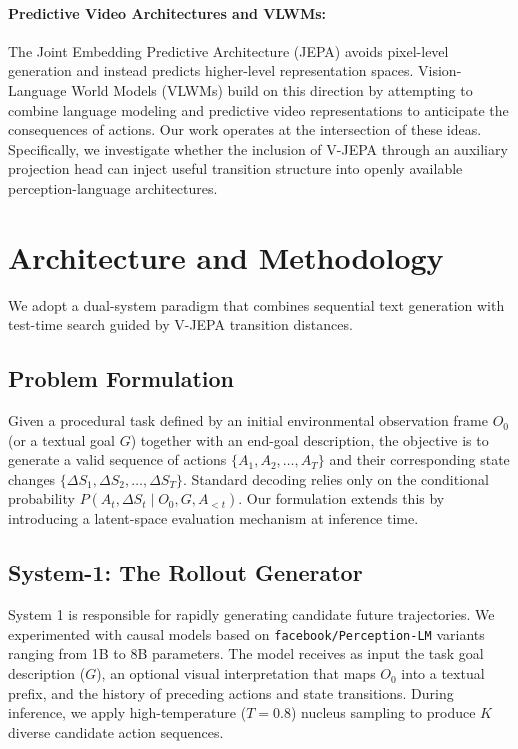 \documentclass{article}
\begin{document}
\paragraph{Predictive Video Architectures and VLWMs:}
The Joint Embedding Predictive Architecture (JEPA) \citep{assran2025vjepa2} avoids pixel-level generation and instead predicts higher-level representation spaces. Vision-Language World Models (VLWMs) \citep{chen2025planning} build on this direction by attempting to combine language modeling and predictive video representations to anticipate the consequences of actions. Our work operates at the intersection of these ideas. Specifically, we investigate whether the inclusion of V-JEPA through an auxiliary projection head can inject useful transition structure into openly available perception-language architectures.

\section{Architecture and Methodology}

We adopt a dual-system paradigm that combines sequential text generation with test-time search guided by V-JEPA transition distances.

\subsection{Problem Formulation}
Given a procedural task defined by an initial environmental observation frame $O_0$ (or a textual goal $G$) together with an end-goal description, the objective is to generate a valid sequence of actions $\{A_1, A_2, \ldots, A_T\}$ and their corresponding state changes $\{\Delta S_1, \Delta S_2, \ldots, \Delta S_T\}$. Standard decoding relies only on the conditional probability $P(A_t, \Delta S_t \mid O_0, G, A_{<t})$. Our formulation extends this by introducing a latent-space evaluation mechanism at inference time.

\subsection{System-1: The Rollout Generator}
System 1 is responsible for rapidly generating candidate future trajectories. We experimented with causal models based on \texttt{facebook/Perception-LM} variants ranging from 1B to 8B parameters.
The model receives as input the task goal description ($G$), an optional visual interpretation that maps $O_0$ into a textual prefix, and the history of preceding actions and state transitions. During inference, we apply high-temperature ($T=0.8$) nucleus sampling to produce $K$ diverse candidate action sequences.
\end{document}
